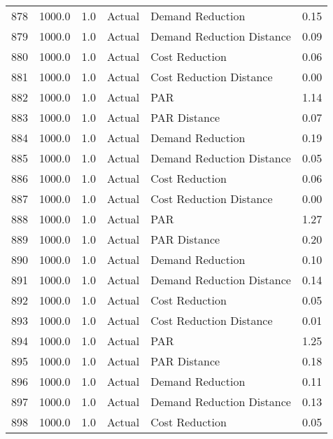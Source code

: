 \begin{longtable}{lrrllr}
878  &       1000.0 &     1.0 &         Actual &           Demand Reduction &   0.15 \\
879  &       1000.0 &     1.0 &         Actual &  Demand Reduction Distance &   0.09 \\
880  &       1000.0 &     1.0 &         Actual &             Cost Reduction &   0.06 \\
881  &       1000.0 &     1.0 &         Actual &    Cost Reduction Distance &   0.00 \\
882  &       1000.0 &     1.0 &         Actual &                        PAR &   1.14 \\
883  &       1000.0 &     1.0 &         Actual &               PAR Distance &   0.07 \\
884  &       1000.0 &     1.0 &         Actual &           Demand Reduction &   0.19 \\
885  &       1000.0 &     1.0 &         Actual &  Demand Reduction Distance &   0.05 \\
886  &       1000.0 &     1.0 &         Actual &             Cost Reduction &   0.06 \\
887  &       1000.0 &     1.0 &         Actual &    Cost Reduction Distance &   0.00 \\
888  &       1000.0 &     1.0 &         Actual &                        PAR &   1.27 \\
889  &       1000.0 &     1.0 &         Actual &               PAR Distance &   0.20 \\
890  &       1000.0 &     1.0 &         Actual &           Demand Reduction &   0.10 \\
891  &       1000.0 &     1.0 &         Actual &  Demand Reduction Distance &   0.14 \\
892  &       1000.0 &     1.0 &         Actual &             Cost Reduction &   0.05 \\
893  &       1000.0 &     1.0 &         Actual &    Cost Reduction Distance &   0.01 \\
894  &       1000.0 &     1.0 &         Actual &                        PAR &   1.25 \\
895  &       1000.0 &     1.0 &         Actual &               PAR Distance &   0.18 \\
896  &       1000.0 &     1.0 &         Actual &           Demand Reduction &   0.11 \\
897  &       1000.0 &     1.0 &         Actual &  Demand Reduction Distance &   0.13 \\
898  &       1000.0 &     1.0 &         Actual &             Cost Reduction &   0.05 \\

\end{longtable}
